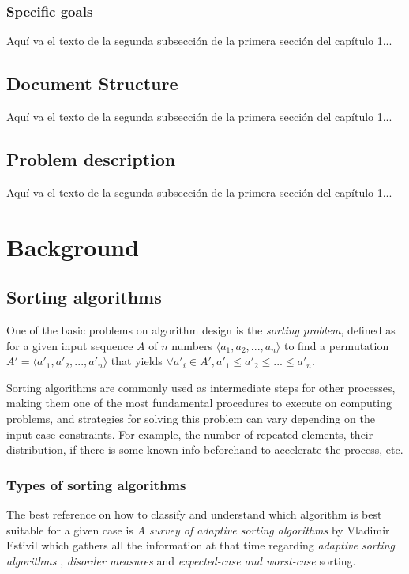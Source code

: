 \documentclass{iccmemoria}
\begin{document}
\subsection{Specific goals}
Aquí va el texto de la segunda subsección de la primera sección del capítulo 1...

\section{Document Structure}
Aquí va el texto de la segunda subsección de la primera sección del capítulo 1...

\section{Problem description}
Aquí va el texto de la segunda subsección de la primera sección del capítulo 1...


\chapter{Background}

\section{Sorting algorithms}
One of the basic problems on algorithm design is the \textit{sorting problem}, defined as for a given input sequence $A$ of $n$ numbers $\langle a_1, a_2,...,a_n \rangle$ to find a permutation $A' = \langle a'_1, a'_2,...,a'_n \rangle$ that yields $\forall a'_i \in A', a'_1 \leq a'_2 \leq ... \leq a'_n $.

Sorting algorithms are commonly used as intermediate steps for other processes, making them one of the most fundamental procedures to execute on computing problems, and strategies for solving this problem can vary depending on the input case constraints. For example, the number of repeated elements, their distribution, if there is some known info beforehand to accelerate the process, etc.

\subsection{Types of sorting algorithms}
The best reference on how to classify and understand which algorithm is best suitable for a given case is \textit{A survey of adaptive sorting algorithms} by Vladimir Estivil\cite{estivil92} which gathers all the information at that time regarding \textit{adaptive sorting algorithms} \cite{Mehlhorn_1984}, \textit{disorder measures} and \textit{expected-case and worst-case} sorting.
\end{document}

